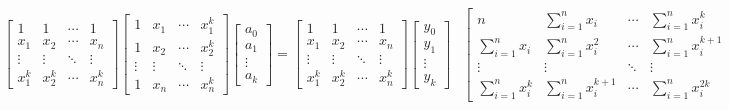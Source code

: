 \begin{subequations}
    \begin{align}\label{eq: pseudo_inverse_poly_reg}
    \begin{bmatrix}
    1 & 1 & \cdots & 1 \\ 
    x_1 & x_2  & \cdots  & x_n \\ 
    \vdots  & \vdots  & \ddots  & \vdots \\ 
    x_1^k & x_2^k & \cdots  & x_n^k
    \end{bmatrix}
    \begin{bmatrix}
    1 & x_1 & \cdots   & x_1^k \\ 
    1 & x_2  & \cdots  & x_2^k \\ 
    \vdots  & \vdots  & \ddots  & \vdots \\ 
    1 & x_n & \cdots  & x_n^k
    \end{bmatrix}
    \begin{bmatrix}
    a_0 \\
    a_1 \\
    \vdots \\
    a_k
    \end{bmatrix}
    =
    \begin{bmatrix}
    1 & 1 & \cdots & 1 \\ 
    x_1 & x_2  & \cdots  & x_n \\ 
    \vdots  & \vdots  & \ddots  & \vdots \\ 
    x_1^k & x_2^k & \cdots  & x_n^k
    \end{bmatrix}
    \begin{bmatrix}
    y_0 \\
    y_1 \\
    \vdots \\
    y_k
    \end{bmatrix}
    \end{align}
    
    \begin{align}\label{eq: solution_poly_reg}
    \begin{bmatrix}
    n & \sum_{i=1}^{n} x_i & \cdots & \sum_{i=1}^{n} x_i^k \\ 
    \sum_{i=1}^{n} x_i & \sum_{i=1}^{n} x_i^2  & \cdots  & \sum_{i=1}^{n} x_i^{k+1} \\ 
    \vdots  & \vdots  & \ddots  & \vdots \\ 
    \sum_{i=1}^{n} x_i^{k} & \sum_{i=1}^{n} x_i^{k+1} & \cdots  & \sum_{i=1}^{n} x_i^{2k}
    \end{bmatrix}
    \begin{bmatrix}
    a_0 \\
    a_1 \\
    \vdots \\
    a_k
    \end{bmatrix}
    =
    \begin{bmatrix}
    \sum_{i=1}^n y_i \\
    \sum_{i=1}^n x_i y_i \\
    \vdots \\
    \sum_{i=1}^n x_i^k y_i
    \end{bmatrix}
    \end{align}
\end{subequations}
